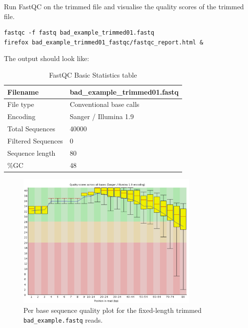 \begin{steps}
Run FastQC on the trimmed file and visualise the quality scores of the trimmed file.
\begin{lstlisting}
fastqc -f fastq bad_example_trimmed01.fastq
firefox bad_example_trimmed01_fastqc/fastqc_report.html &
\end{lstlisting}

The output should look like:

\begin{table}[H]
  \centering
  \caption{FastQC Basic Statistics table}
    \begin{tabular}{ll}
    \toprule
    Filename & bad\_example\_trimmed01.fastq\\
    \midrule
     File type & Conventional base calls\\
     Encoding & Sanger / Illumina 1.9\\
     Total Sequences & 40000\\
     Filtered Sequences & 0\\
     Sequence length & 80\\
    \%GC & 48\\
    \bottomrule
    \end{tabular}
  \label{tab:badexampletrimmed}
\end{table}

\begin{figure}[H]
\centering
\includegraphics[width=0.8\textwidth]{ngs-qc/bad_example_trimmed_to_80bp.png}
\caption{Per base sequence quality plot for the fixed-length trimmed \texttt{bad\_example.fastq} reads.}
\label{fig:bad_example_trimmed_plot}
\end{figure}

\end{steps}

